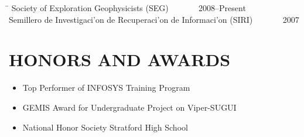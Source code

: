 \documentclass{res}
\begin{document}
\begin{resume}
\begin{tabbing}

\hspace{4.9in}\= \kill %
Society of Exploration Geophysicists (SEG) \> ~~~~~~ 2008--Present\\
Semillero de Investigaci\a'on de Recuperaci\a'on de Informaci\a'on (SIRI) \> ~~~~~~ 2007\\
\end{tabbing}\vspace{-15pt}


% 

\section{HONORS AND AWARDS}          
\begin{itemize}
	\item Top Performer of INFOSYS Training Program
	\item GEMIS Award for Undergraduate Project on Viper-SUGUI
	\item National Honor Society Stratford High School    
\end{itemize}


 
\end{resume}
\end{document}
